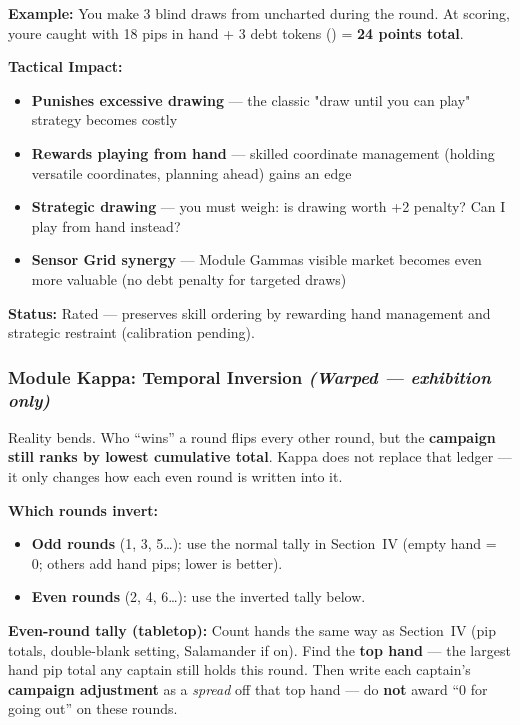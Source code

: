 \documentclass[11pt]{article}
\providecommand{\tightlist}{%
  \setlength{\itemsep}{0pt}\setlength{\parskip}{0pt}}
\begin{document}
\textbf{Example:} You make 3 blind draws from uncharted during the
round. At scoring, you\textquotesingle re caught with 18 pips in hand +
3 debt tokens () = \textbf{24 points total}.

\textbf{Tactical Impact:}

\begin{itemize}
\tightlist
\item
  \textbf{Punishes excessive drawing} --- the classic "draw until you
  can play" strategy becomes costly
\item
  \textbf{Rewards playing from hand} --- skilled coordinate management
  (holding versatile coordinates, planning ahead) gains an edge
\item
  \textbf{Strategic drawing} --- you must weigh: is drawing worth +2
  penalty? Can I play from hand instead?
\item
  \textbf{Sensor Grid synergy} --- Module Gamma\textquotesingle s
  visible market becomes even more valuable (no debt penalty for
  targeted draws)
\end{itemize}

\textbf{Status:} Rated --- preserves skill ordering by rewarding hand
management and strategic restraint (calibration pending).

\subsubsection{\texorpdfstring{Module Kappa: Temporal Inversion
\emph{(Warped --- exhibition
only)}}{Module Kappa: Temporal Inversion (Warped --- exhibition only)}}\label{module-kappa-temporal-inversion-warped--exhibition-only}

Reality bends. Who ``wins'' a round flips every other round, but the
\textbf{campaign still ranks by lowest cumulative total}. Kappa does not
replace that ledger --- it only changes how each even round is written
into it.

\textbf{Which rounds invert:}

\begin{itemize}
\tightlist
\item
  \textbf{Odd rounds} (1, 3, 5\ldots): use the normal tally in
  Section~IV (empty hand = 0; others add hand pips; lower is better).
\item
  \textbf{Even rounds} (2, 4, 6\ldots): use the inverted tally below.
\end{itemize}

\textbf{Even-round tally (tabletop):} Count hands the same way as
Section~IV (pip totals, double-blank setting, Salamander if on). Find
the \textbf{top hand} --- the largest hand pip total any captain still
holds this round. Then write each captain's \textbf{campaign
adjustment} as a \emph{spread} off that top hand --- do \textbf{not}
award ``0 for going out'' on these rounds.
\end{document}
